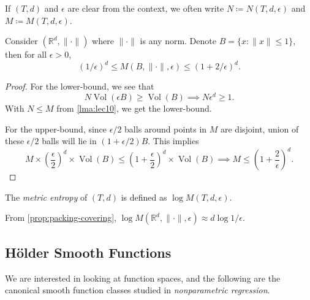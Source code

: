 \begin{notation}
  If \((T, d)\) and \(\epsilon \) are clear from the context, we often write \(N \coloneqq N(T, d, \epsilon )\) and \(M \coloneqq M(T, d, \epsilon )\).
\end{notation}

\begin{proposition}\label{prop:packing-covering}
  Consider \((\mathbb{R} ^d, \lVert \cdot \rVert )\) where \(\lVert \cdot \rVert \) is any norm. Denote \(B = \{ x \colon \lVert x \rVert \leq 1 \} \), then for all \(\epsilon > 0\),
  \[
    (1 / \epsilon) ^d \leq M(B, \lVert \cdot \rVert , \epsilon ) \leq (1 + 2 / \epsilon )^d.
  \]
\end{proposition}
\begin{proof}
  For the lower-bound, we see that
  \[
    N \mathop{\mathrm{Vol}}(\epsilon B) \geq \mathop{\mathrm{Vol}}(B)
    \implies N \epsilon ^d \geq 1.
  \]
  With \(N \leq M\) from \autoref{lma:lec10}, we get the lower-bound.

  For the upper-bound, since \(\epsilon / 2\) balls around points in \(M\) are disjoint, union of these \(\epsilon / 2\) balls will lie in \((1 + \epsilon / 2)B\). This implies
  \[
    M \times \left( \frac{\epsilon}{2} \right) ^d \times \mathop{\mathrm{Vol}}(B) \leq \left( 1 + \frac{\epsilon}{2} \right) ^d \times \mathop{\mathrm{Vol}}(B)
    \implies M \leq \left( 1 + \frac{2}{\epsilon } \right) ^d.
  \]
\end{proof}

\begin{definition}\label{def:metric-entropy}
  The \emph{metric entropy} of \((T, d)\) is defined as \(\log M(T, d, \epsilon )\).
\end{definition}

\begin{note}
  From \autoref{prop:packing-covering}, \(\log M(\mathbb{R} ^d, \lVert \cdot \rVert , \epsilon ) \approx d \log 1 / \epsilon \).
\end{note}

\subsection{Hölder Smooth Functions}
We are interested in looking at function spaces, and the following are the canonical smooth function classes studied in \emph{nonparametric regression}.

